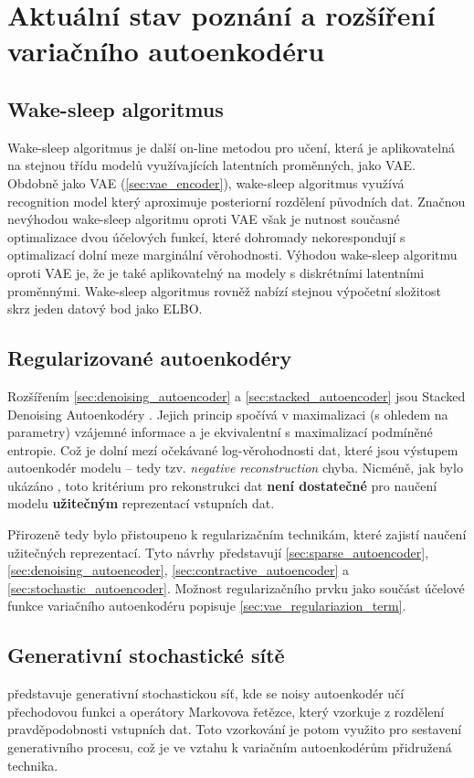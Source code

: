 \section{Aktuální stav poznání a rozšíření variačního autoenkodéru}

\subsection{Wake-sleep algoritmus}
Wake-sleep algoritmus \cite{Hinton1995} je další on-line metodou pro učení, která je aplikovatelná na stejnou třídu modelů využívajících latentních proměnných, jako VAE.
Obdobně jako VAE (\autoref{sec:vae_encoder}), wake-sleep algoritmus využívá recognition model který aproximuje posteriorní rozdělení původních dat.
Značnou nevýhodou wake-sleep algoritmu oproti VAE však je nutnost současné optimalizace dvou účelových funkcí, které dohromady nekorespondují s optimalizací dolní meze marginální věrohodnosti.
Výhodou wake-sleep algoritmu oproti VAE je, že je také aplikovatelný na modely s diskrétními latentními proměnnými.
Wake-sleep algoritmus rovněž nabízí stejnou výpočetní složitost skrz jeden datový bod jako ELBO. \cite{Kingma2019}

\subsection{Regularizované autoenkodéry}
Rozšířením \autoref{sec:denoising_autoencoder} a \autoref{sec:stacked_autoencoder} jsou Stacked Denoising Autoenkodéry \cite{Vincent2010}. Jejich princip spočívá v maximalizaci (s ohledem na parametry) vzájemné informace  a je ekvivalentní s maximalizací podmíněné entropie. Což je dolní mezí očekávané log-věrohodnosti dat, které jsou výstupem autoenkodér modelu – tedy tzv. \emph{negative reconstruction} chyba.
Nicméně, jak bylo ukázáno \cite{Bengio2014}, toto kritérium pro rekonstrukci dat \textbf{není dostatečné} pro naučení modelu \textbf{užitečným} reprezentací vstupních dat.

Přirozeně tedy bylo přistoupeno k regularizačním technikám, které zajistí naučení užitečných reprezentací. Tyto návrhy představují \autoref{sec:sparse_autoencoder}, \autoref{sec:denoising_autoencoder}, \autoref{sec:contractive_autoencoder} a \autoref{sec:stochastic_autoencoder}.
Možnost regularizačního prvku jako součást účelové funkce variačního autoenkodéru popisuje \autoref{sec:vae_regulariazion_term}.

\subsection{Generativní stochastické sítě}
\cite{Bengio2014a} představuje generativní stochastickou síť, kde se noisy autoenkodér učí přechodovou funkci a operátory Markovova řetězce, který vzorkuje z rozdělení pravděpodobnosti vstupních dat.  Toto vzorkování je potom využito pro sestavení generativního procesu, což je ve vztahu k variačním autoenkodérům přidružená technika. \cite{Kingma2019}

